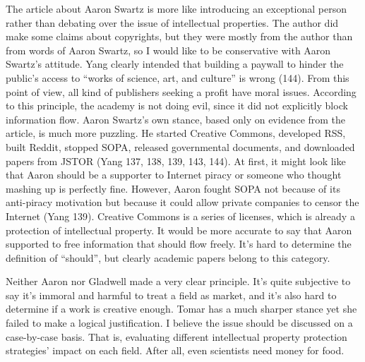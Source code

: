 \documentclass{writing}
\begin{document}
The article about Aaron Swartz is more like introducing an exceptional
person rather than debating over the issue of intellectual properties.
The author did make some claims about copyrights, but they were mostly
from the author than from words of Aaron Swartz, so I would like to be
conservative with Aaron Swartz's attitude. Yang clearly intended that
building a paywall to hinder the public's access to ``works of science,
art, and culture'' is wrong (144). From this point of view, all kind of
publishers seeking a profit have moral issues. According to this
principle, the academy is not doing evil, since it did not explicitly
block information flow. Aaron Swartz's own stance, based only on
evidence from the article, is much more puzzling. He started Creative
Commons, developed RSS, built Reddit, stopped SOPA, released
governmental documents, and downloaded papers from JSTOR (Yang 137, 138,
139, 143, 144). At first, it might look like that Aaron should be a
supporter to Internet piracy or someone who thought mashing up is
perfectly fine. However, Aaron fought SOPA not because of its
anti-piracy motivation but because it could allow private companies to
censor the Internet (Yang 139). Creative Commons is a series of
licenses, which is already a protection of intellectual property. It
would be more accurate to say that Aaron supported to free information
that should flow freely. It's hard to determine the definition of
``should'', but clearly academic papers belong to this category.

Neither Aaron nor Gladwell made a very clear principle. It's quite
subjective to say it's immoral and harmful to treat a field as market,
and it's also hard to determine if a work is creative enough. Tomar has
a much sharper stance yet she failed to make a logical justification. I
believe the issue should be discussed on a case-by-case basis. That is,
evaluating different intellectual property protection strategies' impact
on each field. After all, even scientists need money for food.
\end{document}
